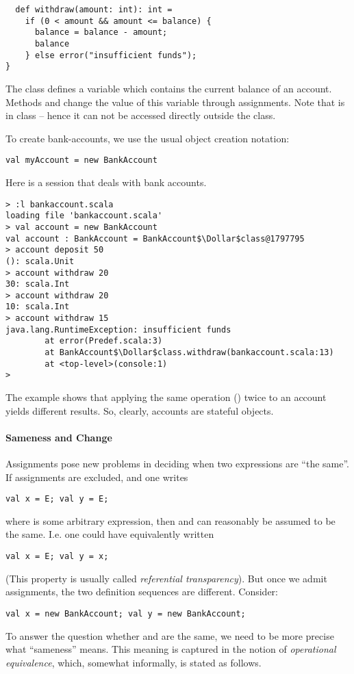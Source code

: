 {\begin{lstlisting}
  def withdraw(amount: int): int =
    if (0 < amount && amount <= balance) {
      balance = balance - amount;
      balance
    } else error("insufficient funds");
}
\end{lstlisting}
The class defines a variable  which contains the current
balance of an account. Methods  and 
change the value of this variable through assignments.  Note that
 is  in class  -- hence
it can not be accessed directly outside the class.

To create bank-accounts, we use the usual object creation notation:
\begin{lstlisting}
val myAccount = new BankAccount
\end{lstlisting}

\example Here is a  session that deals with bank
accounts.

\begin{lstlisting}
> :l bankaccount.scala
loading file 'bankaccount.scala'
> val account = new BankAccount
val account : BankAccount = BankAccount$\Dollar$class@1797795
> account deposit 50
(): scala.Unit
> account withdraw 20
30: scala.Int
> account withdraw 20
10: scala.Int
> account withdraw 15
java.lang.RuntimeException: insufficient funds
        at error(Predef.scala:3)
        at BankAccount$\Dollar$class.withdraw(bankaccount.scala:13)
        at <top-level>(console:1)
> 
\end{lstlisting}
The example shows that applying the same operation () twice to an account yields different results. So, clearly,
accounts are stateful objects.  

\paragraph{Sameness and Change}
Assignments pose new problems in deciding when two expressions are
``the same''.
If assignments are excluded, and one writes
\begin{lstlisting}
val x = E; val y = E;
\end{lstlisting}
where  is some arbitrary expression,
then  and  can reasonably be assumed to be the same.
I.e. one could have equivalently written
\begin{lstlisting}
val x = E; val y = x;
\end{lstlisting}
(This property is usually called {\em referential transparency}). But
once we admit assignments, the two definition sequences are different.
Consider:
\begin{lstlisting}
val x = new BankAccount; val y = new BankAccount;
\end{lstlisting}
To answer the question whether  and  are the same, we
need to be more precise what ``sameness'' means. This meaning is
captured in the notion of {\em operational equivalence}, which,
somewhat informally, is stated as follows.

}
